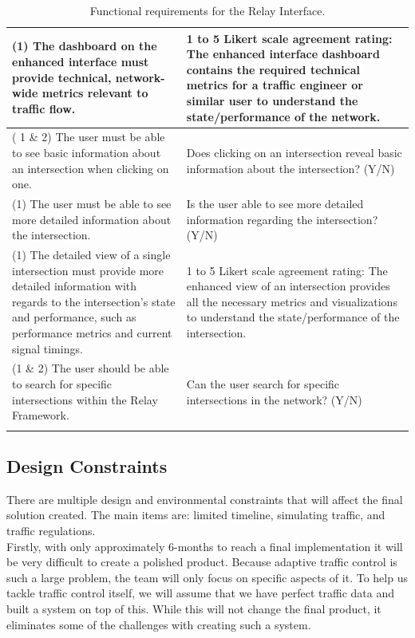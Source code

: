 \documentclass{article}
\begin{document}
\begin{longtable}[htbp!] {|p{6cm}|p{6cm}|}
(1) The dashboard on the enhanced interface must provide technical, network-wide metrics relevant to traffic flow. & 1 to 5 Likert scale agreement rating: The enhanced interface dashboard contains the required technical metrics for a traffic engineer or similar user to understand the state/performance of the network. \\ \hline
( 1 \& 2) The user must be able to see basic information about an intersection when clicking on one. & Does clicking on an intersection reveal basic information about the intersection? (Y/N) \\ \hline
(1) The user must be able to see more detailed information about the intersection. & Is the user able to see more detailed information regarding the intersection? (Y/N) \\ \hline
(1) The detailed view of a single intersection must provide more detailed information with regards to the intersection's state and performance, such as performance metrics and current signal timings. & 1 to 5 Likert scale agreement rating: The enhanced view of an intersection provides all the necessary metrics and visualizations to understand the state/performance of the intersection. \\ \hline
(1 \& 2) The user should be able to search for specific intersections within the Relay Framework. & Can the user search for specific intersections in the network? (Y/N) \\ \hline
\caption{Functional requirements for the Relay Interface.}
\label{table:interface-functional-requirements}
\end{longtable}

\subsection{Design Constraints}

There are multiple design and environmental constraints that will affect the final solution created.
The main items are: limited timeline, simulating traffic, and traffic regulations.\\

Firstly, with only approximately 6-months to reach a final implementation it will be very difficult to create a polished product.
Because adaptive traffic control is such a large problem, the team will only focus on specific aspects of it.
To help us tackle traffic control itself, we will assume that we have perfect traffic data and built a system on top of this.
While this will not change the final product, it eliminates some of the challenges with creating such a system.\\
\end{document}
